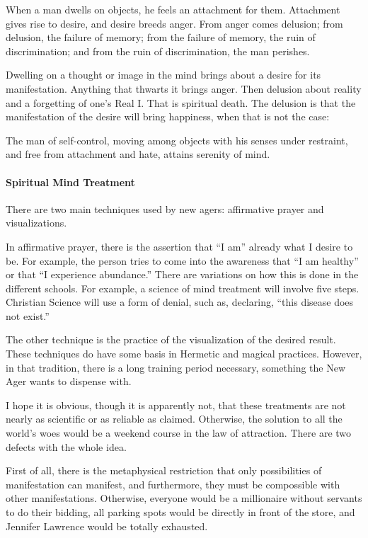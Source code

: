 \begin{quotex}
When a man dwells on objects, he feels an attachment for them. Attachment gives rise to desire, and desire breeds anger. From anger comes delusion; from delusion, the failure of memory; from the failure of memory, the ruin of discrimination; and from the ruin of discrimination, the man perishes. 

\end{quotex}
Dwelling on a thought or image in the mind brings about a desire for its manifestation. Anything that thwarts it brings anger. Then delusion about reality and a forgetting of one's Real I. That is spiritual death. The delusion is that the manifestation of the desire will bring happiness, when that is not the case:

\begin{quotex}
The man of self-control, moving among objects with his senses under restraint, and free from attachment and hate, attains serenity of mind. 

\end{quotex}
\paragraph{Spiritual Mind Treatment}
There are two main techniques used by new agers: affirmative prayer and visualizations.

In affirmative prayer, there is the assertion that “I am” already what I desire to be. For example, the person tries to come into the awareness that “I am healthy” or that “I experience abundance.” There are variations on how this is done in the different schools. For example, a science of mind treatment will involve five steps. Christian Science will use a form of denial, such as, declaring, “this disease does not exist.”

The other technique is the practice of the visualization of the desired result. These techniques do have some basis in Hermetic and magical practices. However, in that tradition, there is a long training period necessary, something the New Ager wants to dispense with.

I hope it is obvious, though it is apparently not, that these treatments are not nearly as scientific or as reliable as claimed. Otherwise, the solution to all the world's woes would be a weekend course in the law of attraction. There are two defects with the whole idea.

First of all, there is the metaphysical restriction that only possibilities of manifestation can manifest, and furthermore, they must be compossible with other manifestations. Otherwise, everyone would be a millionaire without servants to do their bidding, all parking spots would be directly in front of the store, and Jennifer Lawrence would be totally exhausted.

